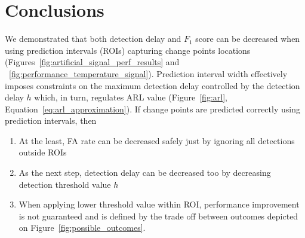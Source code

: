 \section{Conclusions}\label{sec:conclusions}
We demonstrated that both detection delay and $F_1$ score can be decreased when using prediction intervals (ROIs) capturing change points locations (Figures~\ref{fig:artificial_signal_perf_results} and ~\ref{fig:performance_temperature_signal}).
Prediction interval width effectively imposes constraints on the maximum detection delay controlled by the detection delay $h$ which, in turn, regulates ARL value (Figure~\ref{fig:arl}, Equation~\ref{eq:arl_approximation}).
If change points are predicted correctly using prediction intervals, then
\begin{enumerate}
    \item At the least, FA rate can be decreased safely just by ignoring all detections outside ROIs
    \item As the next step, detection delay can be decreased too by decreasing detection threshold value $h$ 
    \item When applying lower threshold value within ROI, performance improvement is not guaranteed and is defined by the trade off between outcomes depicted on Figure~\ref{fig:possible_outcomes}.
\end{enumerate}


